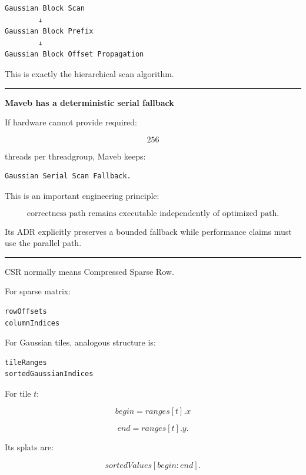 \protect{}\label{4z8tmw}%
\begin{verbatim}
Gaussian Block Scan
        ↓
Gaussian Block Prefix
        ↓
Gaussian Block Offset Propagation
\end{verbatim}

This is exactly the hierarchical scan algorithm.

\begin{center}\rule{0.5\linewidth}{0.5pt}\end{center}

\textbf{Maveb has a deterministic serial fallback}

If hardware cannot provide required:

\[
256
\]

threads per threadgroup, Maveb keeps:

\protect{}\label{81ri4m}%
\begin{verbatim}
Gaussian Serial Scan Fallback.
\end{verbatim}

This is an important engineering principle:

\[
\boxed{
\text{correctness path remains executable independently of optimized path}.
}
\]

Its ADR explicitly preserves a bounded fallback while performance claims must use the parallel path.

\begin{center}\rule{0.5\linewidth}{0.5pt}\end{center}

CSR normally means Compressed Sparse Row.

For sparse matrix:

\protect{}\label{jurd6v}%
\begin{verbatim}
rowOffsets
columnIndices
\end{verbatim}

For Gaussian tiles, analogous structure is:

\protect{}\label{re9vks}%
\begin{verbatim}
tileRanges
sortedGaussianIndices
\end{verbatim}

For tile \(t\):

\[
begin=
ranges[t].x
\]

\[
end=
ranges[t].y.
\]

Its splats are:

\[
sortedValues[
begin:end
].
\]

